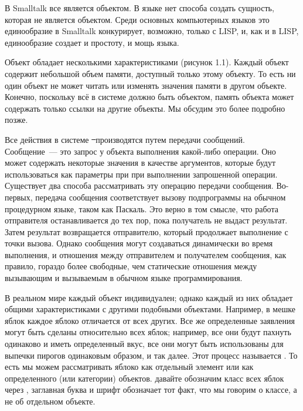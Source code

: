 \secdown

В Smalltalk все является объектом. В языке нет способа создать сущность, 
которая не является объектом. Среди основных компьютерных языков это 
единообразие в Smalltalk конкурирует, возможно, только с LISP, и, 
как и в LISP, единообразие создает и простоту, и мощь языка.

Объект обладает несколькими характеристиками (рисунок 1.1). Каждый объект 
содержит небольшой объем памяти, доступный только этому объекту. То есть 
ни один объект не может читать или изменять значения памяти в другом 
объекте. Конечно, поскольку всё в системе должно быть объектом, память 
объекта может содержать только ссылки на другие объекты. Мы обсудим 
это более подробно позже.


Все действия в системе \st\ производятся путем передачи сообщений. 
Сообщение\ --- это запрос у объекта выполнения какой-либо операции. Оно 
может содержать некоторые значения в качестве аргументов, которые будут 
использоваться как параметры при при выполнении запрошенной операции. 
Существует два способа рассматривать эту операцию передачи сообщения. 
Во-первых, передача сообщения соответствует вызову подпрограммы на обычном 
процедурном языке, таком как Паскаль. Это верно в том смысле, что работа 
отправителя останавливается до тех пор, пока получатель не выдаст результат.
Затем результат возвращается отправителю, который продолжает выполнение 
с точки вызова. Однако сообщения могут создаваться динамически во время 
выполнения, и отношения между отправителем и получателем сообщения, как 
правило, гораздо более свободные, чем статические отношения между 
вызывающим и вызываемым в обычном языке программирования.

В реальном мире каждый объект индивидуален; однако каждый из них обладает 
общими характеристиками с другими подобными объектами. Например, в мешке 
яблок каждое яблоко отличается от всех других. Все же определенные заявления 
могут быть сделаны относительно всех яблок; например, все они будут 
пахнуть одинаково и иметь определенный вкус, все они могут быть использованы 
для выпечки пирогов одинаковым образом, и так далее. Этот процесс называется 
. То есть мы можем рассматривать яблоко как отдельный элемент 
или как  определенного  (или категории) объектов. давайте 
обозначим класс всех яблок через , заглавная буква и шрифт обозначает 
тот факт, что мы говорим о классе, а не об отдельном объекте.

